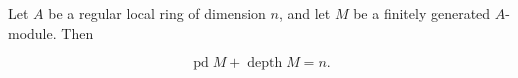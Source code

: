 Let $A$ be a regular local ring of dimension $n$, and let $M$ be a finitely generated $A$-module. Then

$$\operatorname{pd} M + \operatorname{depth} M = n.$$
